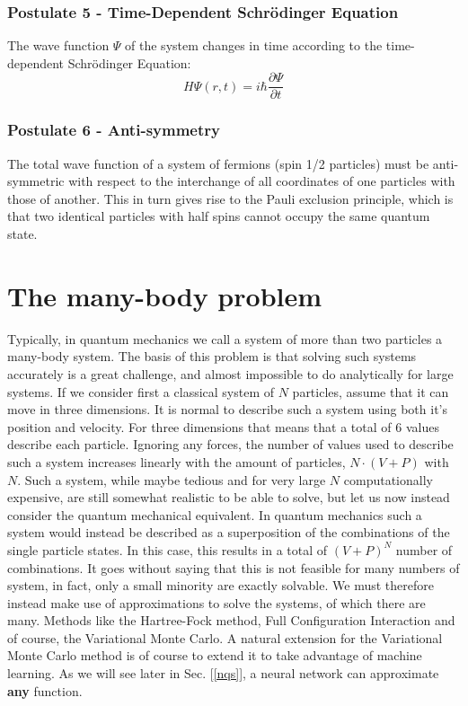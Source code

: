 \documentclass[12pt]{article}
\begin{document}
{\subsubsection*{Postulate 5 - Time-Dependent Schrödinger Equation}
The wave function $\Psi$ of the system changes in time according to the time-dependent Schrödinger Equation:
\begin{equation*}
    H \Psi(r, t) = i \hbar \frac{\partial \Psi}{\partial t}
\end{equation*}
\subsubsection*{Postulate 6 - Anti-symmetry} \label{antisym}
The total wave function of a system of fermions (spin 1/2 particles) must be anti-symmetric with respect to the interchange of all coordinates of one particles with those of another.
\newline
This in turn gives rise to the Pauli exclusion principle, which is that two identical particles with half spins cannot occupy the same quantum state.
\section{The many-body problem}
Typically, in quantum mechanics we call a system of more than two particles a many-body system. The basis of this problem is that solving such systems accurately is a great challenge, and almost impossible to do analytically for large systems. \newline
If we consider first a classical system of $N$ particles, assume that it can move in three dimensions. It is normal to describe such a system using both it's position and velocity. For three dimensions that means that a total of $6$ values describe each particle. Ignoring any forces, the number of values used to describe such a system increases linearly with the amount of particles, $N \cdot \left(V + P\right)$ with $N$. Such a system, while maybe tedious and for very large $N$ computationally expensive, are still somewhat realistic to be able to solve, but let us now instead consider the quantum mechanical equivalent. \newline
In quantum mechanics such a system would instead be described as a superposition of the combinations of the single particle states. In this case, this results in a total of $\left(V + P\right)^N$ number of combinations. \newpage
It goes without saying that this is not feasible for many numbers of system, in fact, only a small minority are exactly solvable. We must therefore instead make use of approximations to solve the systems, of which there are many. Methods like the Hartree-Fock method, Full Configuration Interaction and of course, the Variational Monte Carlo. \newline
A natural extension for the Variational Monte Carlo method is of course to extend it to take advantage of machine learning. As we will see later in Sec. [\ref{nqs}], a neural network can approximate \textbf{any} function.
}
\end{document}
